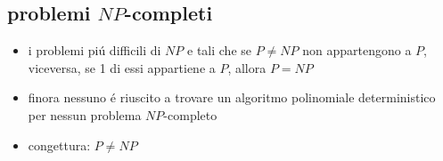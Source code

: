 
\subsection*{problemi $NP$-completi}
\begin{flushleft}
	\begin{itemize}
		\item i problemi pi\'u difficili di $NP$ e tali che se $P\neq NP$ non appartengono a $P$, viceversa, se 1 di essi appartiene a $P$, allora $P=NP$
		\item finora nessuno \'e riuscito a trovare un algoritmo polinomiale deterministico per nessun problema $NP$-completo
		\item congettura: $P\neq NP$
	\end{itemize}
\end{flushleft}


\newpage
